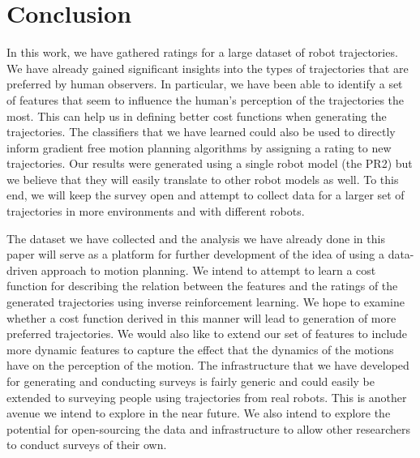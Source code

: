 \documentclass[letterpaper, 10 pt, conference]{ieeeconf}  %
\begin{document}
\section{Conclusion}
\label{sec:conclusion}
In this work, we have gathered ratings for a large dataset of robot trajectories. We have already gained significant insights into the 
types of trajectories that are preferred by human observers. In particular, we have been able to identify a set of features that seem to influence 
the human's perception of the trajectories the most. This can help us in defining better cost functions when generating the trajectories. The classifiers 
that we have learned could also be used to directly inform gradient free motion planning algorithms by assigning a rating to new trajectories. Our 
results were generated using a single robot model (the PR2) but we believe that they will easily translate to other robot models as well. To this end, 
we will keep the survey open and attempt to collect data for a larger set of trajectories in 
more environments and with different robots. 

The dataset we have collected and the analysis we have already done in this paper will serve as a
 platform for further development of the idea of using 
a data-driven approach to motion planning. We intend to attempt to learn a cost function for describing the relation between the features and 
the ratings of the generated trajectories using inverse reinforcement learning. We hope to examine whether a cost function derived in this manner will 
lead to generation of more preferred trajectories. We would also like to extend our set of features to include more dynamic features to capture the effect 
that the dynamics of the motions have on the perception of the motion. The infrastructure that we have developed for generating and conducting 
surveys is fairly generic and could easily be extended to surveying people using trajectories from real robots. This is another avenue we intend to explore 
in the near future. We also intend to explore the potential for open-sourcing the data and infrastructure to allow other researchers to conduct surveys of their own. 

\end{document}
